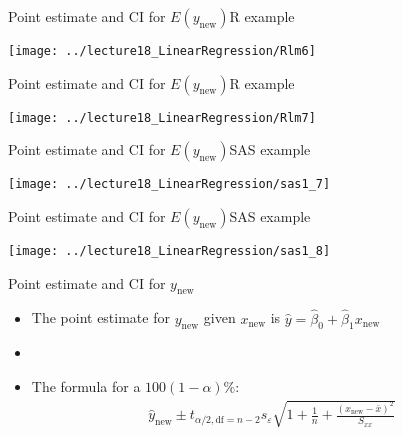 \documentclass[xcolor=dvipsnames]{beamer}
\begin{document}
\begin{frame}{Point estimate and CI for $E(y_{\text{new}})$}{R example}
	\begin{center}
		\texttt{[image: ../lecture18\_LinearRegression/Rlm6]}
	\end{center}
\end{frame}

\begin{frame}{Point estimate and CI for $E(y_{\text{new}})$}{R example}
	\begin{center}
		\texttt{[image: ../lecture18\_LinearRegression/Rlm7]}
	\end{center}
\end{frame}

\begin{frame}{Point estimate and CI for $E(y_{\text{new}})$}{SAS example}
	\begin{center}
		\texttt{[image: ../lecture18\_LinearRegression/sas1\_7]}
	\end{center}
\end{frame}

\begin{frame}{Point estimate and CI for $E(y_{\text{new}})$}{SAS example}
	\begin{center}
		\texttt{[image: ../lecture18\_LinearRegression/sas1\_8]}
	\end{center}
\end{frame}

\begin{frame}{Point estimate and CI for $y_{\text{new}}$}
	\begin{itemize}
		\item The point estimate for $y_{\text{new}}$ given $x_{\text{new}}$ is $\hat{y}=\hat{\beta}_0 + \hat{\beta}_1 x_{\text{new}}$
		\item[]
		\item The formula for a $100(1-\alpha)\%$: 
		\begin{gather*}
			\hat{y}_{\text{new}} \pm t_{\alpha / 2, \text{df} = n-2}s_{\varepsilon}\sqrt{1+\frac{1}{n} + \frac{(x_{\text{new}}-\bar{x})^2}{S_{xx}}}
		\end{gather*}
	\end{itemize}
\end{frame}
\end{document}
